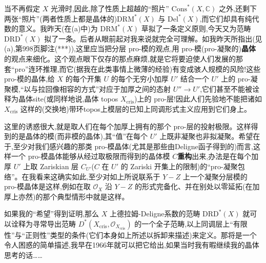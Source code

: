 \noindent 当不再假定 $X$ 光滑时,因此,除了性质上超越的“照片” $\mathrm{Cons}^{*}(X,\mathbb{C})$ 之外,还剩下两张“照片”(两者性质上都是晶体的)$\mathrm{DRM}^{*}(X)$ 与 $\mathrm{Del}^{*}(X)$,而它们却具有纯代数的意义。我昨天(在(a)中)为 $\mathrm{DRM}^{*}(X)$ 草拟了一条定义原则,今天又为范畴 $\mathrm{DRD}^{*}(X)$ 拟了一条。后者从眼前起对我来说就完全可理解。如我昨天所指出(见(a),第998页脚注(***)),这里应当把分层 pro-模的观点,用 pro-模(pro-凝聚的)\textbf{晶体}的观点来细化。这个观点眼下仅存的那点麻烦,就是它将要迫使人们发展的那套“pro”连环推理,而它(据我在此类事情上微薄的经验)有变成骇人规模的风险!这些 pro-模的晶体,给 $X$ 的每个开集 $U$ 的每个无穷小加厚 $U'$ 结合一个 $U'$ 上的 pro-凝聚模,“以与拉回像相容的方式”对应于加厚之间的态射 $U''\to U'$,它们甚至不能被诠释为晶体site(或同样地说,晶体
topos $X_{\mathrm{cris}}$)上的 pro-层!因此人们先验地不能把诸如 $X_{\mathrm{cris}}$ 这样的(交换地)带环topos上模层的已知上同调形式主义应用到它们身上。

\noindent 这里的诱惑很大,就是取人们在每个加厚上拥有的那个 pro-层的投射极限。这样得到的是晶体的模(而非模的晶体),其“值”在每个 $U'$ 上既非凝聚也非拟凝聚。希望在于,至少对我们感兴趣的那类 pro-模晶体(尤其是那些由Deligne函子得到的)而言,这样一个 pro-模晶体能够从经过取极限而得到的晶体模 $C$\textbf{重构}出来,办法是在每个加厚 $U'$ 上取 Zariskian 层 $C_{U'}$($C$ 在 $U'$ 的 Zariski 开集上的限制)的“pro-凝聚包络”。在我看来这确实如此,至少对如上所说联系于 $Y-Z$ 上一个凝聚分层模的 pro-模晶体是这样,例如在取 $\mathcal{O}_{X}$ 沿 $Y-Z$ 的形式完备化、并在别处以零延拓(在加厚上亦然)的那个典型情形中就是这样。

\noindent 如果我的“希望”得到证明,那么 $X$ 上德拉姆-Deligne系数的范畴 $\mathrm{DRD}^{*}(X)$ 就可以诠释为寻常导出范畴 $D^{*}(X_{\mathrm{cris}},\mathcal{O}_{X_{\mathrm{cris}}})$ 的一个全子范畴,以上同调层上“有限性”与“正则性”类型的条件(它们本身如上所述以拆卸来描述)来定义。那将是一个令人困惑的简单描述,我早在1966年就可以把它给出,如果当时我有暇继续我的晶体思考的话……

